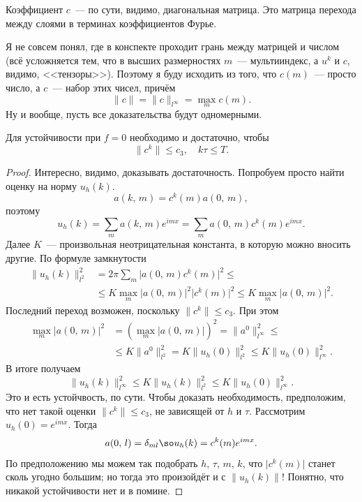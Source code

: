 \documentclass{trlnotes}
\begin{document}
\begin{rem} 
	Коэффициент $c$~--- по сути, видимо, диагональная матрица. Это матрица перехода между слоями в терминах коэффициентов Фурье. 

	Я не совсем понял, где в конспекте проходит грань между матрицей и числом (всё усложняется тем, что в высших размерностях $m$~--- мультииндекс, а $u^k$ и $c$, видимо, <<тензоры>>). Поэтому я буду исходить из того, что $c(m)$~--- просто число, а $c$~--- набор этих чисел, причём
	\[  
		\|c\| = \|c\|_{l^{\infty}} = \max\limits_m c(m).
	\]
	Ну и вообще, пусть все доказательства будут одномерными.
\end{rem}

\begin{thm}
	Для устойчивости при $f = 0$ необходимо и достаточно, чтобы
	\[
		\|c^k\| \leqslant c_3, \quad k\tau \leqslant T.
	\]
	\begin{proof}
		Интересно, видимо, доказывать достаточность. Попробуем просто найти оценку на норму $u_h(k)$.
		\[
			a(k, \, m) = c^k(m)a(0, \, m),
		\]
		поэтому 
		\[
			u_h(k) = \sum\limits_m a(k, \, m) e^{imx} = \sum\limits_m a(0, \, m) c^k(m) e^{imx}.
		\]
		Далее $K$~--- произвольная неотрицательная константа, в которую можно вносить другие.
		По формуле замкнутости
		\begin{align*}
			\big\|u_h(k)\big\|_{l^2}^2 &= 2\pi \sum\limits_m \big|a(0, \, m) c^k(m)\big|^2 \leqslant \\ & \leqslant K \max\limits_{m} \big|a(0, \, m)\big|^2 \big|c^k(m)\big|^2 \leqslant  K \max\limits_m |a(0, \, m)\big|^2.
		\end{align*}
		Последний переход возможен, поскольку $\|c^k\| \leqslant c_3$.
		При этом
		\begin{align*}
			\max\limits_m |a(0, \, m)\big|^2 &= \left(\max\limits_m |a(0, \, m)\big|\right)^2 = \|a^0\|_{l^{\infty}}^2 \leqslant \\ &\leqslant K\|a^0\|_{l^2}^2 = K \big\|u_h(0)\big\|_{l^2}^2 \leqslant K\big\|u_h(0)\big\|_{l^{\infty}}^2.
		\end{align*}
		В итоге получаем
		\[
			\big\|u_h(k)\big\|_{l^{\infty}}^2 \leqslant K\big\|u_h(k)\big\|_{l^2}^2 \leqslant K\big\|u_h(0)\big\|_{l^{\infty}}^2.
		\]
		Это и есть устойчвость, по сути.
		Чтобы доказать необходимость, предположим, что нет такой оценки $\|c^k\| \leqslant c_3$, не зависящей от $h$ и $\tau$. Рассмотрим $u_h(0) = e^{imx}$. Тогда
		\[
			a(0, \, l) = \delta_{ml} \so u_h(k) = c^k(m)e^{imx}.
		\]
		По предположению мы можем так подобрать $h, \, \tau, \, m, \, k$, что $\big|c^k(m)\big|$ станет сколь угодно большим; но тогда это произойдёт и с $\|u_h(k)\|$! Понятно, что никакой устойчивости нет и в помине.
	\end{proof}
\end{thm}
\end{document}
